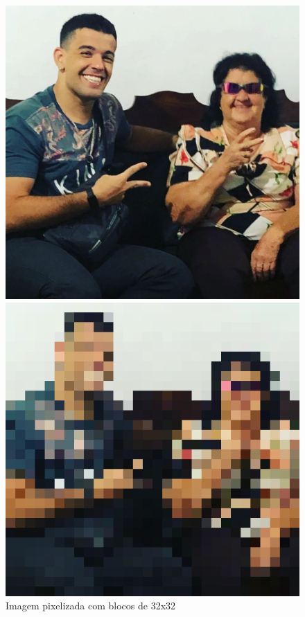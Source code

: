 \begin{figure}[htbp]
    \centering
    \caption{Imagem pixelizada com blocos de 32x32}
        \begin{minipage}{0.4\textwidth}
            \includegraphics[width=\textwidth]{figuras/pixelizacao/foto.jpeg}
        \end{minipage}
        \begin{minipage}{0.4\textwidth}
            \includegraphics[width=\textwidth]{figuras/pixelizacao/32.png}
        \end{minipage}
    \label{fig:Imagem pixelizada}
\end{figure}











